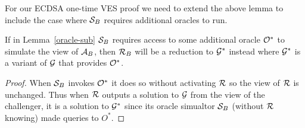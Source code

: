 For our ECDSA one-time VES proof we need to extend the above lemma to include the case where $\mathcal{S}_B$ requires additional oracles to run.

\begin{corollary}
  If in Lemma~\ref{oracle-sub} $\mathcal{S}_B$ requires access to some additional oracle $\mathcal{O}^*$ to simulate the view of $\mathcal{A}_B$, then $\mathcal{R}_B$ will be a reduction to $\mathcal{G}^*$ instead where $\mathcal{G}^*$ is a variant of $\mathcal{G}$ that provides $\mathcal{O}^*$.
\end{corollary}
\begin{proof}
  When $\mathcal{S}_B$ invokes $\mathcal{O}^*$ it does so without activating $\mathcal{R}$ so the view of $\mathcal{R}$ is unchanged.
  Thus when $\mathcal{R}$ outputs a solution to $\mathcal{G}$ from the view of the challenger, it is a solution to $\mathcal{G}^*$ since its oracle simualtor $\mathcal{S}_B$ (without $\mathcal{R}$ knowing) made queries to $O^*$.
\end{proof}
